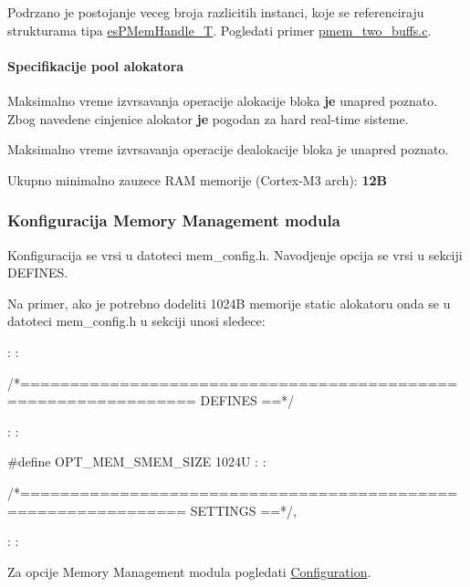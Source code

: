 Podrzano je postojanje veceg broja razlicitih instanci, koje se referenciraju strukturama tipa \hyperlink{group__mem__intf_gaf82f01d26c4f6bc9a2b672a673b09ce2}{es\-P\-Mem\-Handle\-\_\-\-T}. Pogledati primer \hyperlink{pmem_two_buffs_8c-example}{pmem\-\_\-two\-\_\-buffs.\-c}.\hypertarget{group__mem_mem_pool_specs}{}\paragraph{Specifikacije pool alokatora}\label{group__mem_mem_pool_specs}

\begin{DoxyItemize}
\item Maksimalno vreme izvrsavanja operacije alokacije bloka {\bfseries je} unapred poznato. Zbog navedene cinjenice alokator {\bfseries je} pogodan za hard real-\/time sisteme.
\item Maksimalno vreme izvrsavanja operacije dealokacije bloka je unapred poznato.
\item Ukupno minimalno zauzece R\-A\-M memorije (Cortex-\/\-M3 arch)\-: {\bfseries 12\-B} 
\end{DoxyItemize}\hypertarget{group__mem_mem_configuration}{}\subsubsection{Konfiguracija Memory Management modula}\label{group__mem_mem_configuration}
Konfiguracija se vrsi u datoteci mem\-\_\-config.\-h. Navodjenje opcija se vrsi u sekciji D\-E\-F\-I\-N\-E\-S.

Na primer, ako je potrebno dodeliti 1024\-B memorije static alokatoru onda se u datoteci mem\-\_\-config.\-h u sekciji { unosi} sledece\-:


\begin{DoxyCode}
    :
    :
    
\textcolor{comment}{/*===============================================================  DEFINES  ==*/}
    
    :
    :
    
\textcolor{preprocessor}{#define OPT\_MEM\_SMEM\_SIZE               1024U}
\textcolor{preprocessor}{}
    :
    :
    
\textcolor{comment}{/*==============================================================  SETTINGS  ==*/},

    :
    :
\end{DoxyCode}


Za opcije Memory Management modula pogledati \hyperlink{group__mem__cfg}{Configuration}. 